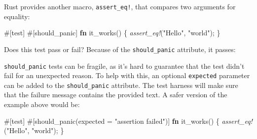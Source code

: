 \documentclass[a4paper,]{book}
\newenvironment{Shaded}{\begin{snugshade}}{\end{snugshade}}
\newcommand{\KeywordTok}[1]{\textcolor[rgb]{0.13,0.29,0.53}{\textbf{{#1}}}}
\newcommand{\StringTok}[1]{\textcolor[rgb]{0.31,0.60,0.02}{{#1}}}
\newcommand{\PreprocessorTok}[1]{\textcolor[rgb]{0.56,0.35,0.01}{\textit{{#1}}}}
\newcommand{\AttributeTok}[1]{\textcolor[rgb]{0.77,0.63,0.00}{{#1}}}
\newcommand{\NormalTok}[1]{{#1}}
\begin{document}
Rust provides another macro, \texttt{assert\_eq!}, that compares two
arguments for equality:

\begin{Shaded}
\begin{Highlighting}[]
\AttributeTok{#[}\NormalTok{test}\AttributeTok{]}
\AttributeTok{#[}\NormalTok{should_panic}\AttributeTok{]}
\KeywordTok{fn} \NormalTok{it_works() \{}
    \PreprocessorTok{assert_eq!}\NormalTok{(}\StringTok{"Hello"}\NormalTok{, }\StringTok{"world"}\NormalTok{);}
\NormalTok{\}}
\end{Highlighting}
\end{Shaded}

Does this test pass or fail? Because of the \texttt{should\_panic}
attribute, it passes:

\begin{Shaded}
\end{Shaded}

\texttt{should\_panic} tests can be fragile, as it's hard to guarantee
that the test didn't fail for an unexpected reason. To help with this,
an optional \texttt{expected} parameter can be added to the
\texttt{should\_panic} attribute. The test harness will make sure that
the failure message contains the provided text. A safer version of the
example above would be:

\begin{Shaded}
\begin{Highlighting}[]
\AttributeTok{#[}\NormalTok{test}\AttributeTok{]}
\AttributeTok{#[}\NormalTok{should_panic}\AttributeTok{(}\NormalTok{expected }\AttributeTok{=} \StringTok{"assertion failed"}\AttributeTok{)]}
\KeywordTok{fn} \NormalTok{it_works() \{}
    \PreprocessorTok{assert_eq!}\NormalTok{(}\StringTok{"Hello"}\NormalTok{, }\StringTok{"world"}\NormalTok{);}
\NormalTok{\}}
\end{Highlighting}
\end{Shaded}
\end{document}
